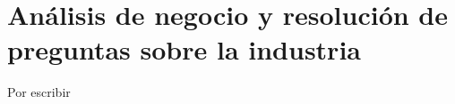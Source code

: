 \chapter{Análisis de negocio y resolución de preguntas sobre la industria}\label{chap:analisis}

Por escribir
